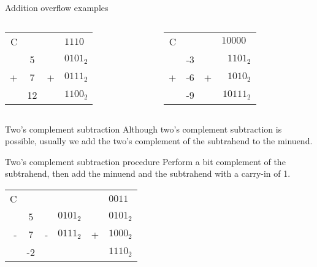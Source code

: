 \begin{frame}{Addition overflow examples}
  \begin{columns}
    \begin{column}{5cm}
      \begin{center}
        \begin{tabular}{rcrl}
          C &    &   & $1110$\\
            & 5  &   & $0101_2$\\
          + & 7  & + & $0111_2$\\
          \hline
            & 12 &   & $1100_2$
        \end{tabular}
      \end{center}
    \end{column}
    \begin{column}{5cm}
      \begin{center}
        \begin{tabular}{rcrr}
          C &    &   & $10000_{\text{  }}$\\
            & -3 &   & $1101_2$\\
          + & -6 & + & $1010_2$\\
          \hline
            & -9 &   & $10111_2$
        \end{tabular}
      \end{center}
    \end{column}
  \end{columns}
\end{frame}

\begin{frame}{Two's complement subtraction}
  Although two's complement subtraction is possible, usually we add the two's complement of the subtrahend to the minuend.
  \begin{block}{Two's complement subtraction procedure}
    Perform a bit complement of the subtrahend, then add the minuend and the subtrahend with a carry-in of 1.
  \end{block}
  \begin{example}
    \begin{center}
      \begin{tabular}{rcrrrl}
        C &    &   &          &   & $0011$\\
          & 5  &   & $0101_2$ &   & $0101_2$\\
        - & 7  & - & $0111_2$ & + & $1000_2$\\
        \hline
          & -2 &   &          &   & $1110_2$
      \end{tabular}
    \end{center}
  \end{example}
\end{frame}

